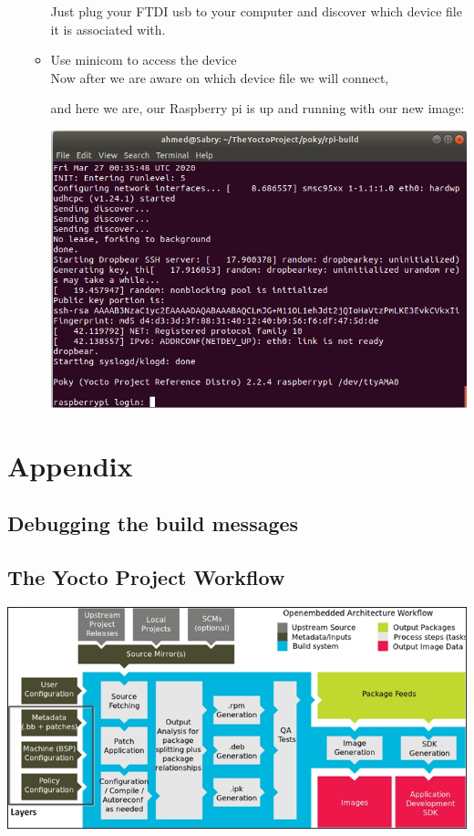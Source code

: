 \documentclass{article}
\begin{document}
\begin{enumerate}
\begin{itemize}
        Just plug your FTDI usb to your computer and discover which device file it is associated with.
        

        \item Use minicom to access the device\\
        Now after we are aware on which device file we will connect, 
        

        and here we are, our Raspberry pi is up and running with our new image:
        \begin{center}
          \includegraphics[scale=0.60]{./resources/img/boot-pi.png}
        \end{center}

      
      \end{itemize}
\end{enumerate}


\section{Appendix}
\subsection{Debugging the build messages}

\subsection{The Yocto Project Workflow}
\begin{center}
  \includegraphics[scale=0.60]{./resources/img/yocto_workflow.jpg}
\end{center}
\end{document}
